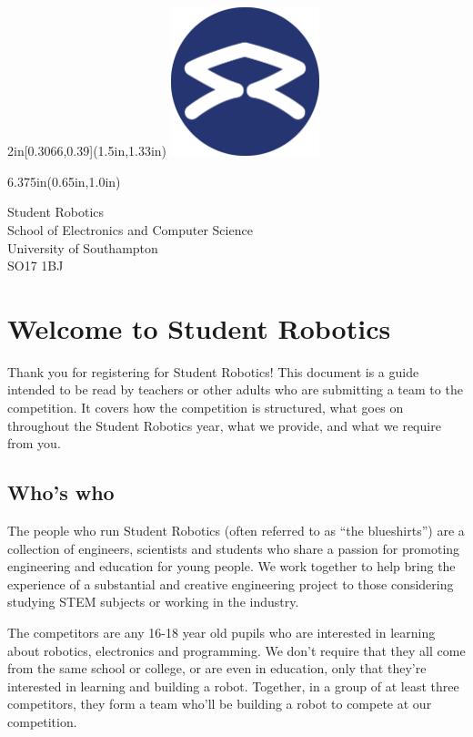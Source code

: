 \documentclass[a4paper]{article}
\begin{document}
\begin{textblock*}{2in}[0.3066,0.39](1.5in,1.33in)
    \includegraphics[width=1.7in]{sr-logo.pdf}
\end{textblock*}
\begin{textblock*}{6.375in}(0.65in,1.0in)
    \sffamily
    \begin{flushright}
    \sffamily \Huge \color{SRblue}
    Student Robotics\\ \large
    \smallskip
    School of Electronics and Computer Science\\
    University of Southampton\\
    SO17 1BJ
    \end{flushright}
\end{textblock*}
\color{black}
\vspace*{0.4in}

\section*{Welcome to Student Robotics}

Thank you for registering for Student Robotics! This document is a guide intended to
be read by teachers or other adults who are submitting a team to the competition. It
covers how the competition is structured, what goes on throughout the Student Robotics
year, what we provide, and what we require from you.


\subsection{Who's who}

The people who run Student Robotics (often referred to as ``the blueshirts'')
are a collection of engineers, scientists and students who share a passion for
promoting engineering and education for young people. We work together to help
bring the experience of a substantial and creative engineering project to those
considering studying STEM subjects or working in the industry.

The competitors are any 16-18 year old pupils who are interested in learning
about robotics, electronics and programming. We don't require that they all
come from the same school or college, or are even in education, only that
they're interested in learning and building a robot. Together, in a group of at
least three competitors, they form a team who'll be building a robot to compete
at our competition.
\end{document}
